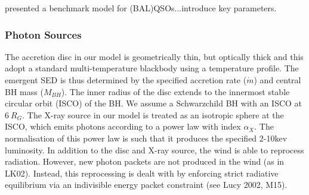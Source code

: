 \documentclass[useAMS,usenatbib]{mn2e_x}
\begin{document}
\cite{higginbottom2013} presented a benchmark model for
(BAL)QSOs...introduce key parameters. 

\subsubsection{Photon Sources}


The accretion disc in our model is geometrically thin, but optically thick
and this adopt a standard multi-temperature blackbody
using a \cite{shakurasunyaev1973} temperature profile. 
The emergent SED is thus determined by the specified accretion rate ($\dot{m}$)
and central BH mass ($M_{BH}$).
The inner radius of the disc extends to the innermost 
stable circular orbit (ISCO) of the BH. 
We assume a Schwarzchild BH with an ISCO at $6~R_G$.
The X-ray source in our model is treated as an isotropic sphere at the ISCO,
which emits photons according to a power law with index $\alpha_X$.
The normalisation of this power law is such that it produces the specified 
2-10kev luminosity.
In addition to the disc and X-ray source, 
the wind is able to reprocess radiation. However, new 
photon packets are not produced in the wind (as in LK02). 
Instead, this reprocessing is dealt with by enforcing strict
radiative equilibrium via an indivisible energy packet
constraint (see Lucy 2002, M15).








\end{document}
